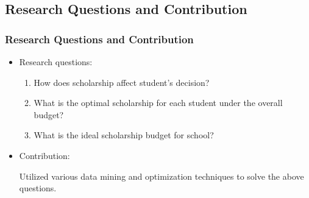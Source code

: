 \documentclass[aspectratio=169]{beamer}
\begin{document}
\subsection{Research Questions and Contribution}
\begin{frame}  
    \frametitle{Research Questions and Contribution}
\begin{itemize}
  \item Research questions:
   \begin{enumerate}
    \item How does scholarship affect student's
    decision?
\item What is the optimal scholarship for each student under the 
    overall budget?
\item What is the ideal scholarship budget for school?
\end{enumerate}


\item Contribution: 

Utilized various data mining and optimization techniques to solve the above
questions.
\end{itemize}


\end{frame}


\end{document}
